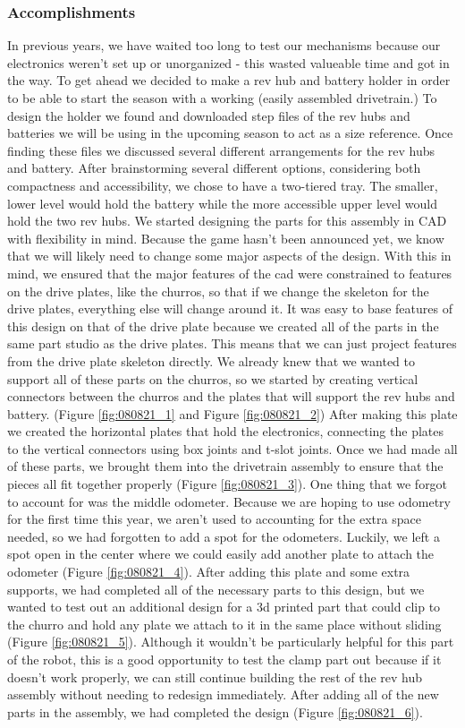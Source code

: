 \subsubsection*{Accomplishments}
 In previous years, we have waited too long to test our mechanisms because our electronics weren’t set up or unorganized - this wasted valueable time and got in the way. To get ahead we decided to make a rev hub and battery holder in order to be able to start the season with a working (easily assembled drivetrain.)
To design the holder we found and downloaded step files of the rev hubs and batteries we will be using in the upcoming season to act as a size reference. Once finding these files we discussed several different arrangements for the rev hubs and battery. After brainstorming several different options, considering both compactness and accessibility, we chose to have a two-tiered tray. The smaller, lower level would hold the battery while the more accessible upper level would hold the two rev hubs.
We started designing the parts for this assembly in CAD with flexibility in mind. Because the game hasn’t been announced yet, we know that we will likely need to change some major aspects of the design. With this in mind, we ensured that the major features of the cad were constrained to features on the drive plates, like the churros, so that if we change the skeleton for the drive plates, everything else will change around it. It was easy to base features of this design on that of the drive plate because we created all of the parts in the same part studio as the drive plates. This means that we can just project features from the drive plate skeleton directly. We already knew that we wanted to support all of these parts on the churros, so we started by creating vertical connectors between the churros and the plates that will support the rev hubs and battery. (Figure \ref{fig:080821_1} and Figure \ref{fig:080821_2}) After making this plate we created the horizontal plates that hold the electronics, connecting the plates to the vertical connectors using box joints and t-slot joints.
Once we had made all of these parts, we brought them into the drivetrain assembly to ensure that the pieces all fit together properly (Figure \ref{fig:080821_3}). One thing that we forgot to account for was the middle odometer. Because we are hoping to use odometry for the first time this year, we aren’t used to accounting for the extra space needed, so we had forgotten to add a spot for the odometers. Luckily, we left a spot open in the center where we could easily add another plate to attach the odometer (Figure \ref{fig:080821_4}). After adding this plate and some extra supports, we had completed all of the necessary parts to this design, but we wanted to test out an additional design for a 3d printed part that could clip to the churro and hold any plate we attach to it in the same place without sliding (Figure \ref{fig:080821_5}). Although it wouldn’t be particularly helpful for this part of the robot, this is a good opportunity to test the clamp part out because if it doesn’t work properly, we can still continue building the rest of the rev hub assembly without needing to redesign immediately. After adding all of the new parts in the assembly, we had completed the design (Figure \ref{fig:080821_6}).

